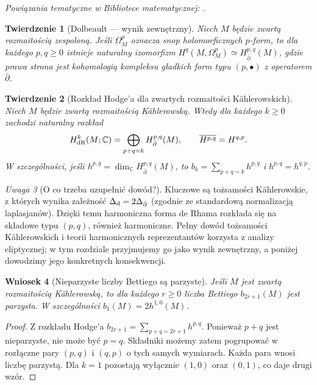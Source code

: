 \documentclass[11pt,a4paper,openany]{report}
\numberwithin{equation}{section}
\theoremstyle{plain}
\newtheorem{twierdzenie}{Twierdzenie}[section]
\newtheorem{wniosek}[twierdzenie]{Wniosek}
\theoremstyle{definition}
\theoremstyle{remark}
\newtheorem{uwaga}[twierdzenie]{Uwaga}
\newcommand{\C}{\mathbb C}
\begin{document}
\noindent\emph{Powiązania tematyczne w Bibliotece matematycznej:} .


\begin{twierdzenie}[Dolbeault — wynik zewnętrzny]
Niech $M$ będzie zwartą rozmaitością zespoloną.
Jeśli $\Omega^p_M$ oznacza snop holomorficznych
$p$-form, to dla każdego $p,q\ge0$ istnieje
naturalny izomorfizm
$H^q(M,\Omega^p_M)\simeq H^{p,q}_{\bar\partial}(M)$,
gdzie prawa strona jest kohomologią kompleksu
gładkich form typu $(p,\bullet)$ z operatorem $\bar\partial$.
\end{twierdzenie}

\begin{twierdzenie}[Rozkład Hodge'a dla zwartych rozmaitości Kählerowskich]
\label{tw:ga9-hodge}
Niech $M$ będzie zwartą rozmaitością Kählerowską.
Wtedy dla każdego $k\ge0$ zachodzi naturalny rozkład
\[
 H^k_{\rm dR}(M;\C)
 =\bigoplus_{p+q=k}H^{p,q}_{\bar\partial}(M),
 \qquad \overline{H^{p,q}}=H^{q,p}.
\]
W szczególności, jeśli $h^{p,q}=\dim_\C H^{p,q}_{\bar\partial}(M)$,
to $b_k=\sum_{p+q=k}h^{p,q}$ i $h^{p,q}=h^{q,p}$.
\end{twierdzenie}

\begin{uwaga}[O co trzeba uzupełnić dowód?]
Kluczowe są tożsamości Kählerowskie, z których
wynika zależność $\Delta_{\rm d}=2\Delta_{\bar\partial}$
(zgodnie ze standardową normalizacją laplasjanów).
Dzięki temu harmoniczna forma de Rhama rozkłada się
na składowe typu $(p,q)$, również harmoniczne.
Pełny dowód tożsamości Kählerowskich i teorii
harmonicznych reprezentantów korzysta z analizy
eliptycznej; w tym rozdziale przyjmujemy go
jako wynik zewnętrzny, a poniżej dowodzimy jego
konkretnych konsekwencji.
\end{uwaga}

\begin{wniosek}[Nieparzyste liczby Bettiego są parzyste]
\label{wn:ga9-odd-betti}
Jeśli $M$ jest zwartą rozmaitością Kählerowską,
to dla każdego $r\ge0$ liczba Bettiego $b_{2r+1}(M)$
jest parzysta. W szczególności $b_1(M)=2h^{1,0}(M)$.
\end{wniosek}
\begin{proof}
Z rozkładu Hodge'a
$b_{2r+1}=\sum_{p+q=2r+1}h^{p,q}$.
Ponieważ $p+q$ jest nieparzyste, nie może być $p=q$.
Składniki możemy zatem pogrupować w rozłączne pary
$(p,q)$ i $(q,p)$ o tych samych wymiarach. Każda para
wnosi liczbę parzystą. Dla $k=1$ pozostają wyłącznie
$(1,0)$ oraz $(0,1)$, co daje drugi wzór.
\end{proof}
\end{document}
